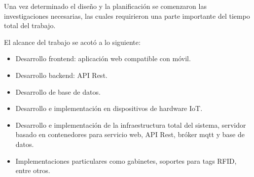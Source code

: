 Una vez determinado el diseño y la planificación se comenzaron las investigaciones necesarias, las cuales requirieron una parte importante del tiempo total del trabajo.

El alcance del trabajo se acotó a lo siguiente:

\begin{itemize}
	\item Desarrollo frontend: aplicación web compatible con móvil.
	\item Desarrollo backend: API Rest.
	\item Desarrollo de base de datos.
	\item Desarrollo e implementación en dispositivos de hardware IoT.
	\item Desarrollo e implementación de la infraestructura total del sistema, servidor basado en contenedores para servicio web, API Rest, bróker mqtt y base de datos. 
	\item Implementaciones particulares como gabinetes, soportes para tags RFID, entre otros.                  
\end{itemize}
%
%
%
%
%
%
%
%
